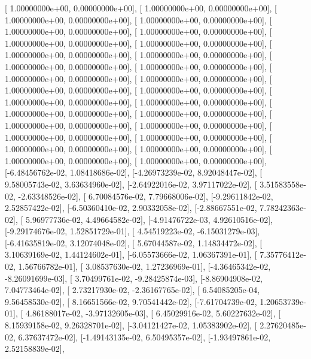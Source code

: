 \documentclass{article}
\begin{document}
       [ 1.00000000e+00,  0.00000000e+00],
       [ 1.00000000e+00,  0.00000000e+00],
       [ 1.00000000e+00,  0.00000000e+00],
       [ 1.00000000e+00,  0.00000000e+00],
       [ 1.00000000e+00,  0.00000000e+00],
       [ 1.00000000e+00,  0.00000000e+00],
       [ 1.00000000e+00,  0.00000000e+00],
       [ 1.00000000e+00,  0.00000000e+00],
       [ 1.00000000e+00,  0.00000000e+00],
       [ 1.00000000e+00,  0.00000000e+00],
       [ 1.00000000e+00,  0.00000000e+00],
       [ 1.00000000e+00,  0.00000000e+00],
       [ 1.00000000e+00,  0.00000000e+00],
       [ 1.00000000e+00,  0.00000000e+00],
       [ 1.00000000e+00,  0.00000000e+00],
       [ 1.00000000e+00,  0.00000000e+00],
       [ 1.00000000e+00,  0.00000000e+00],
       [ 1.00000000e+00,  0.00000000e+00],
       [ 1.00000000e+00,  0.00000000e+00],
       [ 1.00000000e+00,  0.00000000e+00],
       [ 1.00000000e+00,  0.00000000e+00],
       [ 1.00000000e+00,  0.00000000e+00],
       [ 1.00000000e+00,  0.00000000e+00],
       [ 1.00000000e+00,  0.00000000e+00],
       [ 1.00000000e+00,  0.00000000e+00],
       [ 1.00000000e+00,  0.00000000e+00],
       [ 1.00000000e+00,  0.00000000e+00],
       [ 1.00000000e+00,  0.00000000e+00],
       [-6.48456762e-02,  1.08418686e-02],
       [-4.26973239e-02,  8.92048447e-02],
       [ 9.58005743e-02,  3.63634960e-02],
       [-2.64922016e-02,  3.97117022e-02],
       [ 3.51583558e-02, -2.63348526e-02],
       [ 6.70084576e-02,  7.79668006e-02],
       [-9.29611842e-02,  2.52857422e-02],
       [-6.50360410e-02,  2.90332058e-02],
       [-2.88667551e-02,  7.78242363e-02],
       [ 5.96977736e-02,  4.49664582e-02],
       [-4.91476722e-03,  4.92610516e-02],
       [-9.29174676e-02,  1.52851729e-01],
       [ 4.54519223e-02, -6.15031279e-03],
       [-6.41635819e-02,  3.12074048e-02],
       [ 5.67044587e-02,  1.14834472e-02],
       [ 3.10639169e-02,  1.44124602e-01],
       [-6.05573666e-02,  1.06367391e-01],
       [ 7.35776412e-02,  1.56766782e-01],
       [ 3.08537630e-02,  1.27236969e-01],
       [-4.36465342e-02, -8.26091699e-03],
       [ 3.70499761e-02, -9.28425874e-03],
       [-8.86904908e-02,  7.04773464e-02],
       [ 2.73217930e-02, -2.36167765e-02],
       [ 6.54085205e-04,  9.56458530e-02],
       [ 8.16651566e-02,  9.70541442e-02],
       [-7.61704739e-02,  1.20653739e-01],
       [ 4.86188017e-02, -3.97132605e-03],
       [ 6.45029916e-02,  5.60227632e-02],
       [ 8.15939158e-02,  9.26328701e-02],
       [-3.04121427e-02,  1.05383902e-02],
       [ 2.27620485e-02,  6.37637472e-02],
       [-1.49143135e-02,  6.50495357e-02],
       [-1.93497861e-02,  2.52158839e-02],
\end{document}
